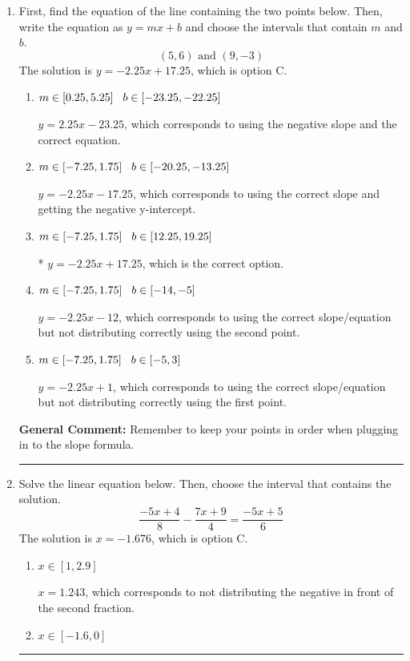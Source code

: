 \documentclass{extbook}[14pt]
\newcommand{\litem}[1]{\item #1

\rule{\textwidth}{0.4pt}}
\begin{document}
\begin{enumerate}\litem{
First, find the equation of the line containing the two points below. Then, write the equation as $ y=mx+b $ and choose the intervals that contain $m$ and $b$.
\[ (5, 6) \text{ and } (9, -3) \]The solution is \( y = -2.25x + 17.25 \), which is option C.\begin{enumerate}[label=\Alph*.]
\item \( m \in [0.25, 5.25] \hspace*{3mm} b \in [-23.25, -22.25] \)

 $y = 2.25x -23.25$, which corresponds to using the negative slope and the correct equation.
\item \( m \in [-7.25, 1.75] \hspace*{3mm} b \in [-20.25, -13.25] \)

 $y = -2.25x -17.25$, which corresponds to using the correct slope and getting the negative y-intercept.
\item \( m \in [-7.25, 1.75] \hspace*{3mm} b \in [12.25, 19.25] \)

* $y = -2.25x + 17.25$, which is the correct option.
\item \( m \in [-7.25, 1.75] \hspace*{3mm} b \in [-14, -5] \)

 $y = -2.25x -12$, which corresponds to using the correct slope/equation but not distributing correctly using the second point.
\item \( m \in [-7.25, 1.75] \hspace*{3mm} b \in [-5, 3] \)

 $y = -2.25x + 1$, which corresponds to using the correct slope/equation but not distributing correctly using the first point.
\end{enumerate}

\textbf{General Comment:} Remember to keep your points in order when plugging in to the slope formula.
}
\litem{
Solve the linear equation below. Then, choose the interval that contains the solution.
\[ \frac{-5x + 4}{8} - \frac{7x + 9}{4} = \frac{-5x + 5}{6} \]The solution is \( x = -1.676 \), which is option C.\begin{enumerate}[label=\Alph*.]
\item \( x \in [1, 2.9] \)

 $x = 1.243$, which corresponds to not distributing the negative in front of the second fraction.
\item \( x \in [-1.6, 0] \)


\end{enumerate}}
\end{enumerate}
\end{document}
